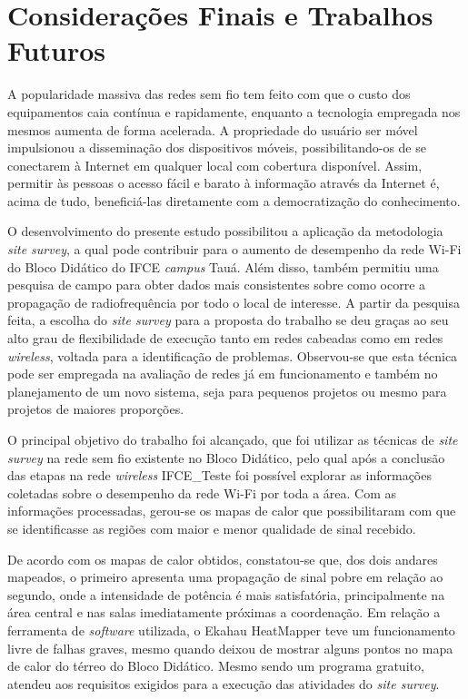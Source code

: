 \chapter{Considerações Finais e Trabalhos Futuros}
\label{cap:conclusoes-e-trabalhos-futuros}

A popularidade massiva das redes sem fio tem feito com que o custo dos equipamentos caia contínua e rapidamente, enquanto a tecnologia empregada nos mesmos aumenta de forma acelerada. A propriedade do usuário ser móvel impulsionou a disseminação dos dispositivos móveis, possibilitando-os de se conectarem à Internet em qualquer local com cobertura disponível. Assim, permitir às pessoas o acesso fácil e barato à informação através da Internet é, acima de tudo, beneficiá-las diretamente com a democratização do conhecimento.

O desenvolvimento do presente estudo possibilitou a aplicação da metodologia \textit{site survey}, a qual pode contribuir para o aumento de desempenho da rede Wi-Fi do Bloco Didático do IFCE \textit{campus} Tauá. Além disso, também permitiu uma pesquisa de campo para obter dados mais consistentes sobre como ocorre a propagação de radiofrequência por todo o local de interesse.
A partir da pesquisa feita, a escolha do \textit{site survey} para a proposta do trabalho se deu graças ao seu alto grau de flexibilidade de execução tanto em redes cabeadas como em redes \textit{wireless}, voltada para a identificação de problemas. Observou-se que esta técnica pode ser empregada na avaliação de redes já em funcionamento e também no planejamento de um novo sistema, seja para pequenos projetos ou mesmo para projetos de maiores proporções.

O principal objetivo do trabalho foi alcançado, que foi utilizar as técnicas de \textit{site survey} na rede sem fio existente no Bloco Didático, pelo qual após a conclusão das etapas na rede \textit{wireless} IFCE\_Teste foi possível explorar as informações coletadas sobre o desempenho da rede Wi-Fi por toda a área. Com as informações processadas, gerou-se os mapas de calor que possibilitaram com que se identificasse as regiões com maior e menor qualidade de sinal recebido.

De acordo com os mapas de calor obtidos, constatou-se que, dos dois andares mapeados, o primeiro apresenta uma propagação de sinal pobre em relação ao segundo, onde a intensidade de potência é mais satisfatória, principalmente na área central e nas salas imediatamente próximas a coordenação.
Em relação a ferramenta de \textit{software} utilizada, o Ekahau HeatMapper teve um funcionamento livre de falhas graves, mesmo quando deixou de mostrar alguns pontos no mapa de calor do térreo do Bloco Didático. Mesmo sendo um programa gratuito, atendeu aos requisitos exigidos para a execução das atividades do \textit{site survey}.


